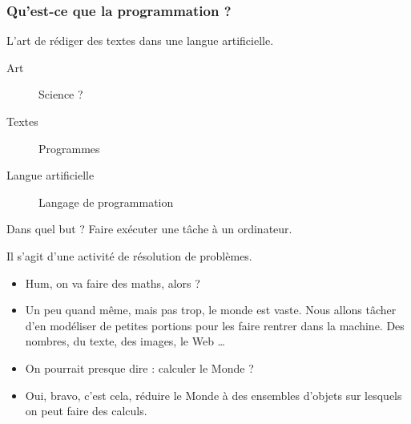 \documentclass[10pt]{beamer}
\begin{document}
\begin{frame}
  \frametitle{Qu'est-ce que la programmation ?}
  \begin{alertblock}{  L'art de rédiger des textes dans une langue artificielle.}
    \begin{description}
    \item[Art] Science ?
    \item[Textes] Programmes
    \item[Langue artificielle] Langage de programmation
    \end{description}
  \end{alertblock}

  \begin{block}{Dans quel but ?}
    Faire exécuter une tâche à un ordinateur.
  \end{block}

  \begin{block}{Il s'agit d'une activité de résolution de problèmes.}
    \begin{itemize}
    \item Hum, on va faire des maths, alors ?
    \item Un peu quand même, mais pas trop, le monde est vaste. Nous allons tâcher d'en modéliser de petites portions pour les faire rentrer dans la machine. Des nombres, du texte, des images, le Web \dots
    \item On pourrait presque dire : calculer le Monde ?
    \item Oui, bravo, c'est cela, \alert{réduire le Monde à des ensembles d'objets sur lesquels on peut faire des calculs.}

    \end{itemize}
  \end{block}
\end{frame}
\end{document}
